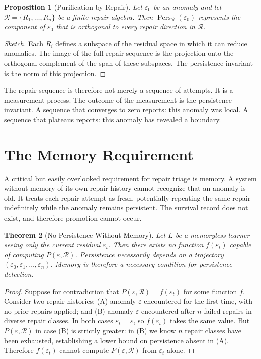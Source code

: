 \documentclass[12pt,oneside]{book}
\theoremstyle{plain}
\newtheorem{theorem}{Theorem}[chapter]
\newtheorem{proposition}[theorem]{Proposition}
\theoremstyle{definition}
\theoremstyle{remark}
\DeclareMathOperator{\Pers}{Pers}
\newcommand{\R}{\mathcal{R}}
\newcommand{\eps}{\varepsilon}
\newcommand{\1}{\mathbf{1}}
\begin{document}
\begin{proposition}[Purification by Repair]
Let $\eps_0$ be an anomaly and let $\R = \{R_1, \ldots, R_n\}$ be a finite repair algebra. Then $\Pers_{\R}(\eps_0)$ represents the component of $\eps_0$ that is orthogonal to every repair direction in $\R$.
\end{proposition}

\begin{proof}[Sketch]
Each $R_i$ defines a subspace of the residual space in which it can reduce anomalies. The image of the full repair sequence is the projection onto the orthogonal complement of the span of these subspaces. The persistence invariant is the norm of this projection.
\end{proof}

The repair sequence is therefore not merely a sequence of attempts. It is a measurement process. The outcome of the measurement is the persistence invariant. A sequence that converges to zero reports: this anomaly was local. A sequence that plateaus reports: this anomaly has revealed a boundary.

\section{The Memory Requirement}

A critical but easily overlooked requirement for repair triage is memory. A system without memory of its own repair history cannot recognize that an anomaly is old. It treats each repair attempt as fresh, potentially repeating the same repair indefinitely while the anomaly remains persistent. The survival record does not exist, and therefore promotion cannot occur.

\begin{theorem}[No Persistence Without Memory]
\label{thm:memory}
Let $L$ be a memoryless learner seeing only the current residual $\eps_t$. Then there exists no function $f(\eps_t)$ capable of computing $P(\eps, \R)$. Persistence necessarily depends on a trajectory $(\eps_0, \eps_1, \ldots, \eps_n)$. Memory is therefore a necessary condition for persistence detection.
\end{theorem}

\begin{proof}
Suppose for contradiction that $P(\eps, \R) = f(\eps_t)$ for some function $f$. Consider two repair histories: (A) anomaly $\eps$ encountered for the first time, with no prior repairs applied; and (B) anomaly $\eps$ encountered after $n$ failed repairs in diverse repair classes. In both cases $\eps_t = \eps$, so $f(\eps_t)$ takes the same value. But $P(\eps, \R)$ in case (B) is strictly greater: in (B) we know $n$ repair classes have been exhausted, establishing a lower bound on persistence absent in (A). Therefore $f(\eps_t)$ cannot compute $P(\eps, \R)$ from $\eps_t$ alone.
\end{proof}
\end{document}

